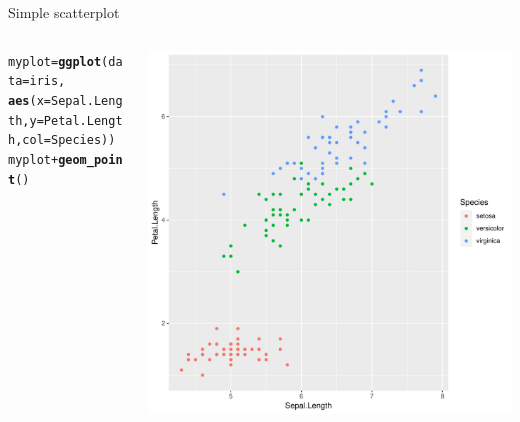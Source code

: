 \documentclass[aspectratio=169]{beamer}\usepackage[]{graphicx}\usepackage[]{color}
\makeatletter
\def\maxwidth{ %
  \ifdim\Gin@nat@width>\linewidth
    \linewidth
  \else
    \Gin@nat@width
  \fi
}
\newcommand{\hlopt}[1]{\textcolor[rgb]{0,0,0}{#1}}%
\newcommand{\hlstd}[1]{\textcolor[rgb]{0.345,0.345,0.345}{#1}}%
\newcommand{\hlkwb}[1]{\textcolor[rgb]{0.69,0.353,0.396}{#1}}%
\newcommand{\hlkwc}[1]{\textcolor[rgb]{0.333,0.667,0.333}{#1}}%
\newcommand{\hlkwd}[1]{\textcolor[rgb]{0.737,0.353,0.396}{\textbf{#1}}}%
\newenvironment{kframe}{%
 \def\at@end@of@kframe{}%
 \ifinner\ifhmode%
  \def\at@end@of@kframe{\end{minipage}}%
  \begin{minipage}{\columnwidth}%
 \fi\fi%
 \def\FrameCommand##1{\hskip\@totalleftmargin \hskip-\fboxsep
 \colorbox{shadecolor}{##1}\hskip-\fboxsep
     \hskip-\linewidth \hskip-\@totalleftmargin \hskip\columnwidth}%
 \MakeFramed {\advance\hsize-\width
   \@totalleftmargin\z@ \linewidth\hsize
   \@setminipage}}%
 {\par\unskip\endMakeFramed%
 \at@end@of@kframe}
\newenvironment{knitrout}{}{} %
\makeatother
\begin{document}
\begin{frame}[fragile]{Simple scatterplot}
\begin{columns}
  \begin{column}{0.50\textwidth}
\begin{knitrout}\tiny
{}\color{fgcolor}\begin{kframe}
\begin{alltt}
\hlstd{myplot} \hlkwb{=} \hlkwd{ggplot}\hlstd{(}\hlkwc{data}\hlstd{=iris,}
                \hlkwd{aes}\hlstd{(}\hlkwc{x}\hlstd{=Sepal.Length,} \hlkwc{y}\hlstd{=Petal.Length,} \hlkwc{col}\hlstd{=Species))}
\hlstd{myplot} \hlopt{+} \hlkwd{geom_point}\hlstd{()}
\end{alltt}
\end{kframe}
\end{knitrout}
  \end{column}
  \begin{column}{0.5\textwidth}
\begin{knitrout}\scriptsize
{}\color{fgcolor}
\includegraphics[width=\maxwidth]{figure/unnamed-chunk-7-1} 

\end{knitrout}
  \end{column}
\end{columns}
\end{frame}
\end{document}
